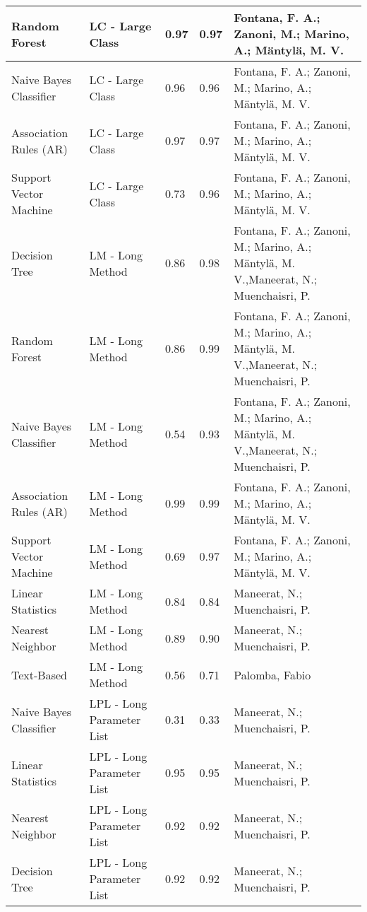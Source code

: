 \begin{small}
\begin{longtable} {|p{}|p{}|l|l|p{}|}
Random Forest          & LC - Large Class            & 0.97    & 0.97 & Fontana, F. A.; Zanoni, M.; Marino, A.; Mäntylä, M. V.\\ \hline
Naive Bayes Classifier & LC - Large Class            & 0.96    & 0.96 & Fontana, F. A.; Zanoni, M.; Marino, A.; Mäntylä, M. V.\\ \hline
Association Rules (AR) & LC - Large Class            & 0.97    & 0.97 & Fontana, F. A.; Zanoni, M.; Marino, A.; Mäntylä, M. V.\\ \hline
Support Vector Machine & LC - Large Class            & 0.73    & 0.96 & Fontana, F. A.; Zanoni, M.; Marino, A.; Mäntylä, M. V.\\ \hline
Decision Tree          & LM - Long Method            & 0.86    & 0.98 & Fontana, F. A.; Zanoni, M.; Marino, A.; Mäntylä, M. V.,Maneerat, N.; Muenchaisri, P.\\ \hline
Random Forest          & LM - Long Method            & 0.86    & 0.99 & Fontana, F. A.; Zanoni, M.; Marino, A.; Mäntylä, M. V.,Maneerat, N.; Muenchaisri, P.\\ \hline
Naive Bayes Classifier & LM - Long Method            & 0.54    & 0.93 & Fontana, F. A.; Zanoni, M.; Marino, A.; Mäntylä, M. V.,Maneerat, N.; Muenchaisri, P.\\ \hline
Association Rules (AR) & LM - Long Method            & 0.99    & 0.99 & Fontana, F. A.; Zanoni, M.; Marino, A.; Mäntylä, M. V.\\ \hline
Support Vector Machine & LM - Long Method            & 0.69    & 0.97 & Fontana, F. A.; Zanoni, M.; Marino, A.; Mäntylä, M. V.\\ \hline
Linear Statistics      & LM - Long Method            & 0.84    & 0.84 & Maneerat, N.; Muenchaisri, P.\\ \hline
Nearest Neighbor       & LM - Long Method            & 0.89    & 0.90 & Maneerat, N.; Muenchaisri, P.\\ \hline
Text-Based             & LM - Long Method            & 0.56    & 0.71 & Palomba, Fabio\\ \hline
Naive Bayes Classifier & LPL - Long Parameter List   & 0.31    & 0.33 & Maneerat, N.; Muenchaisri, P.\\ \hline
Linear Statistics      & LPL - Long Parameter List   & 0.95    & 0.95 & Maneerat, N.; Muenchaisri, P.\\ \hline
Nearest Neighbor       & LPL - Long Parameter List   & 0.92    & 0.92 & Maneerat, N.; Muenchaisri, P.\\ \hline
Decision Tree          & LPL - Long Parameter List   & 0.92    & 0.92 & Maneerat, N.; Muenchaisri, P.\\ \hline

\end{longtable}
\end{small}
